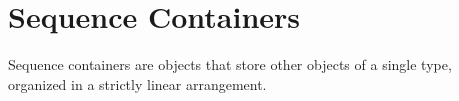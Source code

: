 
\cleardoublepage
\chapter{Sequence Containers}

Sequence containers are objects that store other objects of a single type,
organized in a strictly linear arrangement.



\newpage


\newpage
